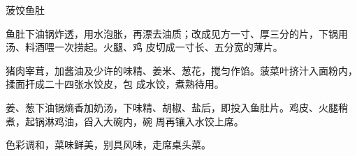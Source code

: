 \begin{recipe}{菠饺鱼肚}

\ingredients


\cooking

\step 鱼肚下油锅炸透，用水泡胀，再漂去油质；改成见方一寸、厚三分的片，下锅用汤、料酒喂一次捞起。火腿、鸡
皮切成一寸长、五分宽的薄片。

猪肉宰茸，加酱油及少许的味精、姜米、葱花，搅匀作馅。菠菜叶挤汁入面粉内，揉面扞成二十四张水饺皮，包
成水饺，煮熟待用。

姜、葱下油锅熵香加奶汤，下味精、胡椒、盐后，即投入鱼肚片。鸡皮、火腿稍煮，起锅淋鸡油，舀入大碗内，碗
周再镶入水饺上席。

\notes

色彩调和，菜味鲜美，别具风味，走席桌头菜。

\end{recipe}

